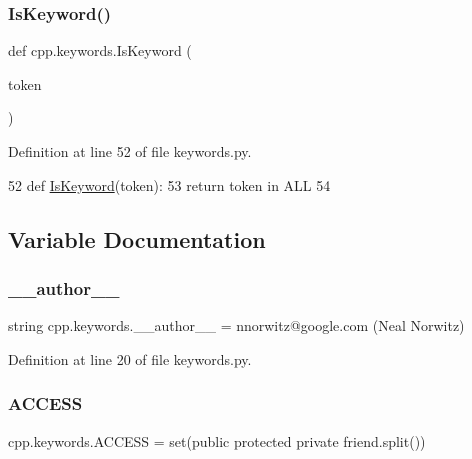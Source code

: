 \subsubsection{\texorpdfstring{Is\+Keyword()}{IsKeyword()}}
{\footnotesize\ttfamily def cpp.\+keywords.\+Is\+Keyword (\begin{DoxyParamCaption}\item[{}]{token }\end{DoxyParamCaption})}



Definition at line 52 of file keywords.\+py.


\begin{DoxyCode}
52 \textcolor{keyword}{def }\hyperlink{namespacecpp_1_1keywords_ab9edc2cbd4a9d5ad58a1c0ad3281cbc9}{IsKeyword}(token):
53     \textcolor{keywordflow}{return} token \textcolor{keywordflow}{in} ALL
54 
\end{DoxyCode}


\subsection{Variable Documentation}
\mbox{\label{namespacecpp_1_1keywords_a9fc334775aca87951ebdcd556dac21cc}} 
\subsubsection{\texorpdfstring{\+\_\+\+\_\+author\+\_\+\+\_\+}{\_\_author\_\_}}
{\footnotesize\ttfamily string cpp.\+keywords.\+\_\+\+\_\+author\+\_\+\+\_\+ = \textquotesingle{}nnorwitz@google.\+com (Neal Norwitz)\textquotesingle{}\hspace{0.3cm}{\ttfamily [private]}}



Definition at line 20 of file keywords.\+py.

\mbox{\label{namespacecpp_1_1keywords_a786f41bbea982641425c819d10bb2064}} 
\subsubsection{\texorpdfstring{A\+C\+C\+E\+SS}{ACCESS}}
{\footnotesize\ttfamily cpp.\+keywords.\+A\+C\+C\+E\+SS = set(\textquotesingle{}public protected private friend\textquotesingle{}.split())}



